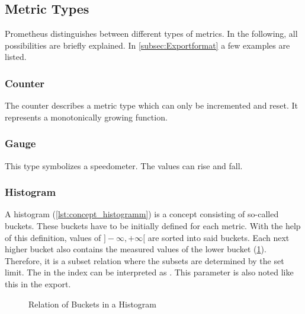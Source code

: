 \subsection{Metric Types}

Prometheus distinguishes between different types of metrics. In the following, all possibilities are briefly explained. In \cref{subsec:Exportformat} a few examples are listed.

\subsubsection{Counter}

The counter describes a metric type which can only be incremented and reset. It represents a monotonically growing function. 

\subsubsection{Gauge}

This type symbolizes a speedometer. The values can rise and fall.

\subsubsection{Histogram}

A histogram (\cref{lst:concept_histogramm}) is a concept consisting of so-called buckets. These buckets have to be initially defined for each metric. With the help of this definition, values of $]-\infty,+\infty[$ are sorted into said buckets. Each next higher bucket also contains the measured values of the lower bucket (\cref{fig:relations_histogramm}). Therefore, it is a subset relation where the subsets are determined by the set limit. The  in the index can be interpreted as . This parameter is also noted like this in the export.

\begin{figure}[H]
	\centering
	\caption{Relation of Buckets in a Histogram}
	\label{fig:relations_histogramm}
\end{figure}

